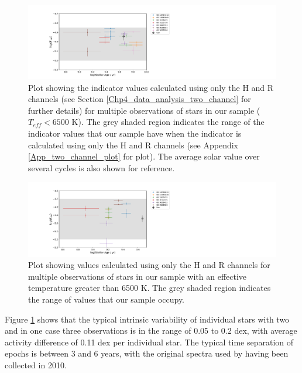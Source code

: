\begin{figure}
    \centering
    \includegraphics[scale=0.55]{Figures/4-Chromospheric_age/cool_multiple_obs_plot_with_sun.pdf}
    \caption[Plot showing activity over several epochs for stars with $T_{eff} < 6500$ K]{Plot showing the \Rprime indicator values calculated using only the H and R channels (see Section \ref{Chp4_data_analysis_two_channel} for further details) for multiple observations of stars in our sample ($T_{eff} < 6500$ K). The grey shaded region indicates the range of the \Rprime indicator values that our sample have when the \Rprime indicator is calculated using only the H and R channels (see Appendix \ref{App_two_channel_plot} for plot). The average solar value over several cycles \citep{Egeland_etal_2017} is also shown for reference.}
    \label{fig:ca_multiple_obs}
\end{figure}

\begin{figure}
    \centering
    \includegraphics[scale=0.55]{Figures/4-Chromospheric_age/hot_multiple_obs_plot_with_sun.pdf}
    \caption[Plot showing activity over several epochs for stars with $T_{eff} > 6500$ K]{Plot showing \Rprime values calculated using only the H and R channels for multiple observations of stars in our sample with an effective temperature greater than 6500 K. The grey shaded region indicates the range of \Rprime values that our sample occupy.}
    \label{fig:ca_multiple_obs_hot_Fstars}
\end{figure}

Figure \ref{fig:ca_multiple_obs} shows that the typical intrinsic variability of individual stars with two and in one case three observations is in the range of 0.05 to 0.2 dex, with average activity difference of 0.11 dex per individual star. The typical time separation of epochs is between 3 and 6 years, with the original spectra used by \citet{Bruntt_etal_2012} having been collected in 2010. 

